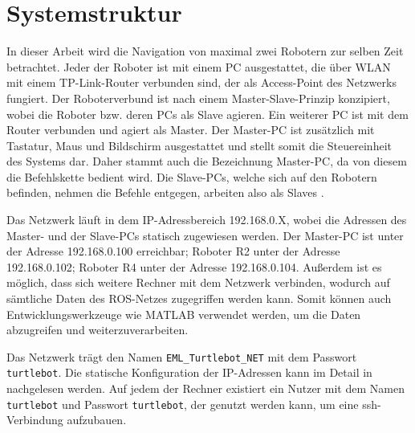 \section{Systemstruktur}
In dieser Arbeit wird die Navigation von maximal zwei Robotern zur selben Zeit betrachtet. Jeder der Roboter ist mit einem PC ausgestattet, die über WLAN mit einem TP-Link-Router verbunden sind, der als Access-Point des Netzwerks fungiert. Der Roboterverbund ist nach einem Master-Slave-Prinzip konzipiert, wobei die Roboter bzw. deren PCs als Slave agieren. Ein weiterer PC ist mit dem Router verbunden und agiert als Master. Der Master-PC ist zusätzlich mit Tastatur, Maus und Bildschirm ausgestattet und stellt somit die Steuereinheit des Systems dar. Daher stammt auch die Bezeichnung Master-PC, da von diesem die Befehlskette bedient wird. Die Slave-PCs, welche sich auf den Robotern befinden, nehmen die Befehle entgegen, arbeiten also als Slaves .

Das Netzwerk läuft in dem IP-Adressbereich 192.168.0.X, wobei die Adressen des Master- und der Slave-PCs statisch zugewiesen werden. Der Master-PC ist unter der Adresse 192.168.0.100 erreichbar; Roboter R2 unter der Adresse 192.168.0.102; Roboter R4 unter der Adresse 192.168.0.104. Außerdem ist es möglich, dass sich weitere Rechner mit dem Netzwerk verbinden, wodurch auf sämtliche Daten des ROS-Netzes zugegriffen werden kann. Somit können auch Entwicklungswerkzeuge wie MATLAB verwendet werden, um die Daten abzugreifen und weiterzuverarbeiten.

Das Netzwerk trägt den Namen \lstinline{EML_Turtlebot_NET}{} mit dem Passwort \lstinline{turtlebot}{}. Die statische Konfiguration der IP-Adressen kann im Detail in \cite[S. 23]{Turtleboys} nachgelesen werden.
Auf jedem der Rechner existiert ein Nutzer mit dem Namen \lstinline{turtlebot}{} und Passwort \lstinline{turtlebot}{}, der genutzt werden kann, um eine ssh-Verbindung aufzubauen.